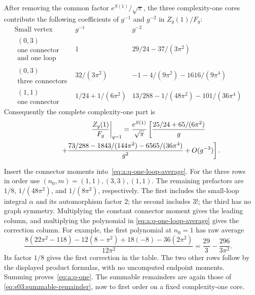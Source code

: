 \begin{prp}\label{prp:a:q-one}
After removing the common factor $e^{S(1)}/\sqrt\pi$, the three
complexity-one cores contribute the following coefficients of
$g^{-1}$ and $g^{-2}$ in $Z_g(1)/F_g$:
\begin{equation}\label{eq:a:q-one-table}
\begin{array}{c|c|c}
 \text{Small vertex}&g^{-1}&g^{-2}\\\hline
 \begin{gathered}(0,3)\\\text{one connector}\\\text{and one loop}\end{gathered}
 &1&29/24-37/(3\pi^2)\\
 \begin{gathered}(0,3)\\\text{three connectors}\end{gathered}
 &32/(3\pi^2)&-1-4/(9\pi^2)-1616/(9\pi^4)\\
 \begin{gathered}(1,1)\\\text{one connector}\end{gathered}
 &1/24+1/(6\pi^2)&13/288-1/(48\pi^2)-101/(36\pi^4)
\end{array}
\end{equation}
Consequently the complete complexity-one part is
\begin{align}
 \left.\frac{Z_g(1)}{F_g}\right|_{q=1}
 =\frac{e^{S(1)}}{\sqrt\pi}\left[
 \frac{25/24+65/(6\pi^2)}g\right.\qquad\notag\\
 \left.\hspace{13mm}
 +\frac{73/288-1843/(144\pi^2)-6565/(36\pi^4)}{g^2}
 +O(g^{-3})\right].
 \label{eq:a:q-one}
\end{align}
\end{prp}
\begin{prf}
Insert the connector moments into~\eqref{eq:a:q-one-loop-average}.
For the three rows in order use $(n_0,m)=(1,1),(3,3),(1,1)$.
The remaining prefactors are $1/8$, $1/(48\pi^2)$, and
$1/(8\pi^2)$, respectively. The first includes the small-loop integral
$\alpha$ and its automorphism factor $2$; the second includes $3!$;
the third has no graph symmetry. Multiplying the constant connector
moment gives the leading column, and multiplying the polynomial in
\eqref{eq:a:q-one-loop-average} gives the correction column.
For example, the first polynomial at $n_0=1$ has raw average
\[
 \frac{8(22\pi^2-118)-12(8-\pi^2)+18(-8)
                   -36(2\pi^2)}{12\pi^2}
 =\frac{29}{3}-\frac{296}{3\pi^2}.
\]
Its factor $1/8$ gives the first correction in the table. The two
other rows follow by the displayed product formulas, with no
uncomputed endpoint moments. Summing proves~\eqref{eq:a:q-one}.
The summable remainders are again those of
\eqref{eq:s03:summable-remainder}, now to first order on a fixed
complexity-one core.
\end{prf}


